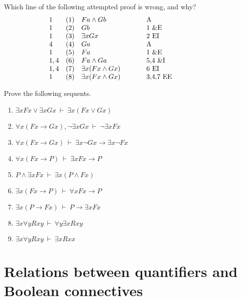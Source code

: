  \begin{exercises} Which line of the following attempted proof is
   wrong, and why?
\[ \begin{array}{l l >{$}p{3cm}<{$} p{3cm}}
1 & (1) & Fa\wedge Gb & A\\
1 & (2) & Gb & 1 \&E \\
1 & (3) & \exists xGx & 2 EI \\
4 & (4) & Ga & A \\
1 & (5) & Fa & 1 \&E \\
1,4 & (6) & Fa\wedge Ga & 5,4 \&I \\
1,4 & (7) & \exists x(Fx\wedge Gx) & 6 EI \\
1 & (8) & \exists x(Fx\wedge Gx) & 3,4,7 EE 
   \end{array} \] \end{exercises}

\begin{exercise} Prove the following sequents. \label{ex:ee}
\begin{enumerate}
  \item $\exists xFx\vee \exists xGx\:\vdash\: \exists x(Fx\vee Gx)$
  \item $\forall x(Fx\to Gx),\neg \exists xGx\:\vdash\:\neg\exists xFx$
\item $\forall x(Fx\to Gx)\:\vdash\:\exists x\neg Gx\to\exists x\neg Fx$
\item $\forall x(Fx\to P)\:\vdash\: \exists xFx\to P$
\item $P\wedge \exists xFx\:\vdash\: \exists x(P\wedge Fx)$
\item $\exists x(Fx\to P)\:\vdash\: \forall xFx\to P$
\item $\exists x(P\to Fx)\:\vdash\: P\to \exists xFx$
\item $\exists x\forall yRxy\:\vdash\: \forall y\exists xRxy$
\item $\exists x\forall yRxy\:\vdash\: \exists xRxx$
\end{enumerate}
\end{exercise}


\section{Relations between quantifiers and Boolean connectives}

